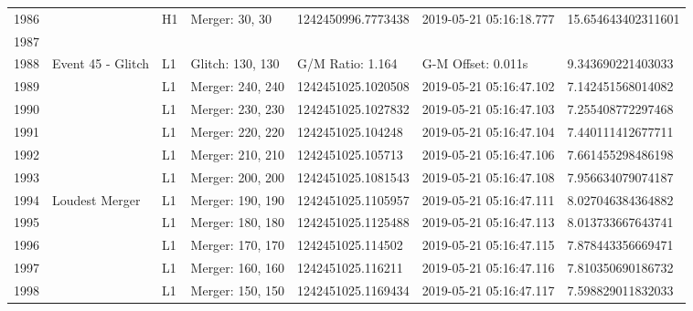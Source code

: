 \begin{longtable}{lllllll}
1986 &                                                    &       H1 &    Merger: 30, 30 &  1242450996.7773438 &  2019-05-21 05:16:18.777 &  15.654643402311601 \\
1987 &                                                    &          &                   &                     &                          &                     \\
1988 &                                  Event 45 - Glitch &       L1 &  Glitch: 130, 130 &    G/M Ratio: 1.164 &       G-M Offset: 0.011s &   9.343690221403033 \\
1989 &                                                    &       L1 &  Merger: 240, 240 &  1242451025.1020508 &  2019-05-21 05:16:47.102 &   7.142451568014082 \\
1990 &                                                    &       L1 &  Merger: 230, 230 &  1242451025.1027832 &  2019-05-21 05:16:47.103 &   7.255408772297468 \\
1991 &                                                    &       L1 &  Merger: 220, 220 &   1242451025.104248 &  2019-05-21 05:16:47.104 &   7.440111412677711 \\
1992 &                                                    &       L1 &  Merger: 210, 210 &   1242451025.105713 &  2019-05-21 05:16:47.106 &   7.661455298486198 \\
1993 &                                                    &       L1 &  Merger: 200, 200 &  1242451025.1081543 &  2019-05-21 05:16:47.108 &   7.956634079074187 \\
1994 &                                     Loudest Merger &       L1 &  Merger: 190, 190 &  1242451025.1105957 &  2019-05-21 05:16:47.111 &   8.027046384364882 \\
1995 &                                                    &       L1 &  Merger: 180, 180 &  1242451025.1125488 &  2019-05-21 05:16:47.113 &   8.013733667643741 \\
1996 &                                                    &       L1 &  Merger: 170, 170 &   1242451025.114502 &  2019-05-21 05:16:47.115 &   7.878443356669471 \\
1997 &                                                    &       L1 &  Merger: 160, 160 &   1242451025.116211 &  2019-05-21 05:16:47.116 &   7.810350690186732 \\
1998 &                                                    &       L1 &  Merger: 150, 150 &  1242451025.1169434 &  2019-05-21 05:16:47.117 &   7.598829011832033 \\

\end{longtable}
